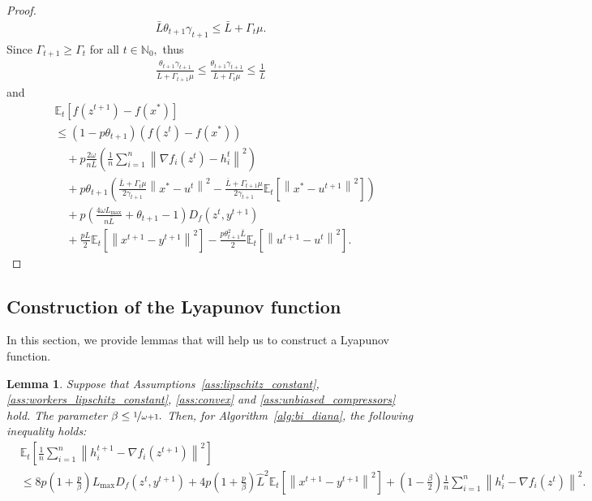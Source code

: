 \documentclass{article} %
\newcommand{\norm}[1]{\left\| #1 \right\|}
\newcommand{\N}{\mathbb{N}} %
\newcommand{\ExpSub}[2]{{\mathbb{E}}_{#1}\left[#2\right]}
\theoremstyle{plain}
\newtheorem{lemma}[theorem]{Lemma}
\theoremstyle{definition}
\theoremstyle{remark}
\begin{document}
\begin{proof}
\begin{align*}
  \bar{L} \theta_{t+1} \gamma_{t+1} \leq \bar{L} + \Gamma_{t} \mu.
\end{align*}
Since $\Gamma_{t+1} \geq \Gamma_{t}$ for all $t \in \N_0,$ thus
\begin{align*}
  \frac{\theta_{t+1} \gamma_{t+1}}{\bar{L} + \Gamma_{t+1} \mu} \leq \frac{\theta_{t+1} \gamma_{t+1}}{\bar{L} + \Gamma_{t} \mu} \leq \frac{1}{\bar{L}}
\end{align*}
and
\begin{align*}
  &\ExpSub{t}{f(z^{t+1}) - f(x^*)} \\
  &\leq (1 - p\theta_{t+1}) \left(f(z^{t}) - f(x^*)\right) \\
  &\quad + p\frac{2 \omega}{n \bar{L}} \left(\frac{1}{n}\sum_{i=1}^n \norm{\nabla f_i(z^{t}) - h_i^t}^2\right) \\
  &\quad+ p\theta_{t+1} \left(\frac{\bar{L} + \Gamma_{t} \mu}{2 \gamma_{t+1}} \norm{x^* - u^t}^2 - \frac{\bar{L} + \Gamma_{t+1} \mu}{2 \gamma_{t+1}} \ExpSub{t}{\norm{x^* - u^{t+1}}^2}\right) \\
  &\quad+ p\left(\frac{4 \omega L_{\max}}{n \bar{L}} + \theta_{t+1} - 1 \right) D_f(z^t, y^{t+1}) \\
  &\quad+ \frac{pL}{2} \ExpSub{t}{\norm{x^{t+1} - y^{t+1}}^2} - \frac{p \theta_{t+1}^2 \bar{L}}{2} \ExpSub{t}{\norm{u^{t+1} - u^t}^2}.
\end{align*}
\end{proof}

\subsection{Construction of the Lyapunov function}

In this section, we provide lemmas that will help us to construct a Lyapunov function.

\begin{lemma}
  \label{lemma:aux_control}
  Suppose that Assumptions~\ref{ass:lipschitz_constant}, \ref{ass:workers_lipschitz_constant}, \ref{ass:convex} and \ref{ass:unbiased_compressors} hold. The parameter $\beta \leq \nicefrac{1}{\omega + 1}.$ Then, for Algorithm~\ref{alg:bi_diana}, the following inequality holds:
  \begin{align}
    \label{eq:aux_control}
    &\ExpSub{t}{\frac{1}{n}\sum_{i=1}^n \norm{h_i^{t+1} - \nabla f_i(z^{t+1})}^2} \\
    &\leq 8 p \left(1 + \frac{p}{\beta}\right) L_{\max} D_f(z^t, y^{t+1}) + 4 p \left(1 + \frac{p}{\beta}\right) \widehat{L}^2 \ExpSub{t}{\norm{x^{t+1} - y^{t+1}}^2} + \left(1 - \frac{\beta}{2}\right) \frac{1}{n}\sum_{i=1}^n \norm{h^{t}_i - \nabla f_i(z^t)}^2.
  \end{align}
\end{lemma}
\end{document}
